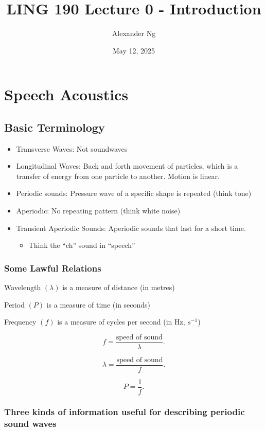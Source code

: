 \documentclass[12pt]{article}
\begin{document}
\title{LING 190 Lecture 0 - Introduction}
\author{Alexander Ng}
\date{May 12, 2025}

\maketitle

\section{Speech Acoustics}

\subsection{Basic Terminology}

\begin{itemize}
  \item Transverse Waves: Not soundwaves
  \item Longitudinal Waves: Back and forth movement of particles, which is a
    transfer of energy from one particle to another. Motion is linear.
  \item Periodic sounds: Pressure wave of a specific shape is repeated (think
    tone)
  \item Aperiodic: No repeating pattern (think white noise)
  \item Transient Aperiodic Sounds: Aperiodic sounds that last for a short
    time.
    \begin{itemize}
    \item Think the \enquote{ch} sound in \enquote{speech}
    \end{itemize}
\end{itemize}

\subsubsection{Some Lawful Relations}

Wavelength $(\lambda)$ is a measure of distance (in metres)

Period $(P)$ is a measure of time (in seconds)

Frequency $(f)$ is a measure of cycles per second (in Hz, $s^{-1}$)

\[
f = \frac{\text{speed of sound}}{\lambda}
.\]

\[
  \lambda = \frac{\text{speed of sound}}{f}
.\]

\[
  P = \frac{1}{f}
.\]

\subsubsection{Three kinds of information useful for describing periodic sound
waves}
\end{document}
